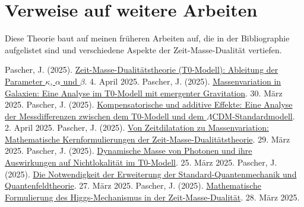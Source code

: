 \documentclass[a4paper,12pt]{article}
\begin{document}
	\section{Verweise auf weitere Arbeiten}
	
	Diese Theorie baut auf meinen früheren Arbeiten auf, die in der Bibliographie aufgelistet sind und verschiedene Aspekte der Zeit-Masse-Dualität vertiefen.
	
	\begin{thebibliography}{99}
		 Pascher, J. (2025). \href{https://github.com/jpascher/T0-Time-Mass-Duality/tree/main/2/pdf/Deutsch/Zeit-Masse-Dualitätstheorie (T0-Modell) Herleitung der Parameter kappa, alpha und beta.pdf}{Zeit-Masse-Dualitätstheorie (T0-Modell): Ableitung der Parameter \(\kappa\), \(\alpha\) und \(\beta\)}. 4. April 2025.
		 Pascher, J. (2025). \href{https://github.com/jpascher/T0-Time-Mass-Duality/tree/main/2/pdf/Deutsch/Massenvariation in Galaxien.pdf}{Massenvariation in Galaxien: Eine Analyse im T0-Modell mit emergenter Gravitation}. 30. März 2025.
		 Pascher, J. (2025). \href{https://github.com/jpascher/T0-Time-Mass-Duality/tree/main/2/pdf/Deutsch/Analyse der Messdifferenzen zwischen dem T0-Modell und dem Standardmodell.pdf}{Kompensatorische und additive Effekte: Eine Analyse der Messdifferenzen zwischen dem T0-Modell und dem \(\Lambda\)CDM-Standardmodell}. 2. April 2025.
		 Pascher, J. (2025). \href{https://github.com/jpascher/T0-Time-Mass-Duality/tree/main/2/pdf/Deutsch/Mathematische Formulierungen der Zeit-Masse-Dualitätstheorie mit Lagrange.pdf}{Von Zeitdilatation zu Massenvariation: Mathematische Kernformulierungen der Zeit-Masse-Dualitätstheorie}. 29. März 2025.
		 Pascher, J. (2025). \href{https://github.com/jpascher/T0-Time-Mass-Duality/tree/main/2/pdf/Deutsch/Dynamische Masse von Photonen und ihre Implikationen für Nichtlokalität.tex}{Dynamische Masse von Photonen und ihre Auswirkungen auf Nichtlokalität im T0-Modell}. 25. März 2025.
		 Pascher, J. (2025). \href{https://github.com/jpascher/T0-Time-Mass-Duality/tree/main/2/pdf/Deutsch/Die Notwendigkeit einer Erweiterung der Standard-Quantenmechanik und Quantenfeldtheorie.pdf}{Die Notwendigkeit der Erweiterung der Standard-Quantenmechanik und Quantenfeldtheorie}. 27. März 2025.
		 Pascher, J. (2025). \href{https://github.com/jpascher/T0-Time-Mass-Duality/tree/main/2/pdf/Deutsch/Mathematische Formulierung des Higgs-Mechanismus in der Zeit-Masse-Dualität.pdf}{Mathematische Formulierung des Higgs-Mechanismus in der Zeit-Masse-Dualität}. 28. März 2025.
	\end{thebibliography}
	
\end{document}
